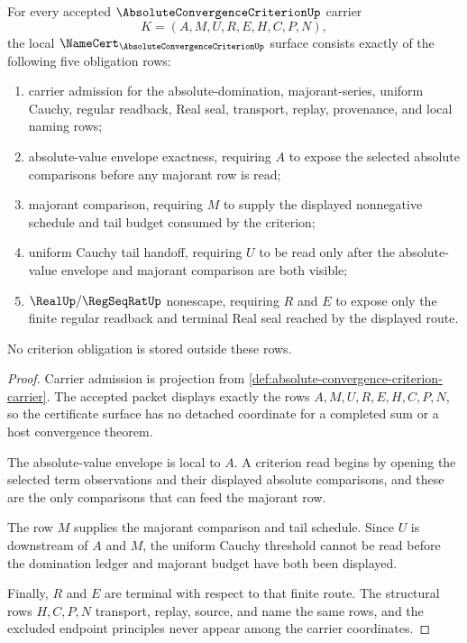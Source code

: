 \begin{theorem}\label{thm:absolute-convergence-criterion-namecert-obligations}
For every accepted $\AbsoluteConvergenceCriterionUp$ carrier
$$
K=(A,M,U,R,E,H,C,P,N),
$$
the local $\NameCert_{\AbsoluteConvergenceCriterionUp}$ surface consists exactly of the following five obligation rows:
\begin{enumerate}
\item carrier admission for the absolute-domination, majorant-series, uniform Cauchy, regular readback, Real seal, transport, replay, provenance, and local naming rows;
\item absolute-value envelope exactness, requiring $A$ to expose the selected absolute comparisons before any majorant row is read;
\item majorant comparison, requiring $M$ to supply the displayed nonnegative schedule and tail budget consumed by the criterion;
\item uniform Cauchy tail handoff, requiring $U$ to be read only after the absolute-value envelope and majorant comparison are both visible;
\item $\RealUp/\RegSeqRatUp$ nonescape, requiring $R$ and $E$ to expose only the finite regular readback and terminal Real seal reached by the displayed route.
\end{enumerate}
No criterion obligation is stored outside these rows.
\end{theorem}
\begin{proof}
Carrier admission is projection from \autoref{def:absolute-convergence-criterion-carrier}. The accepted packet displays exactly the rows $A,M,U,R,E,H,C,P,N$, so the certificate surface has no detached coordinate for a completed sum or a host convergence theorem.

The absolute-value envelope is local to $A$. A criterion read begins by opening the selected term observations and their displayed absolute comparisons, and these are the only comparisons that can feed the majorant row.

The row $M$ supplies the majorant comparison and tail schedule. Since $U$ is downstream of $A$ and $M$, the uniform Cauchy threshold cannot be read before the domination ledger and majorant budget have both been displayed.

Finally, $R$ and $E$ are terminal with respect to that finite route. The structural rows $H,C,P,N$ transport, replay, source, and name the same rows, and the excluded endpoint principles never appear among the carrier coordinates.
\end{proof}

